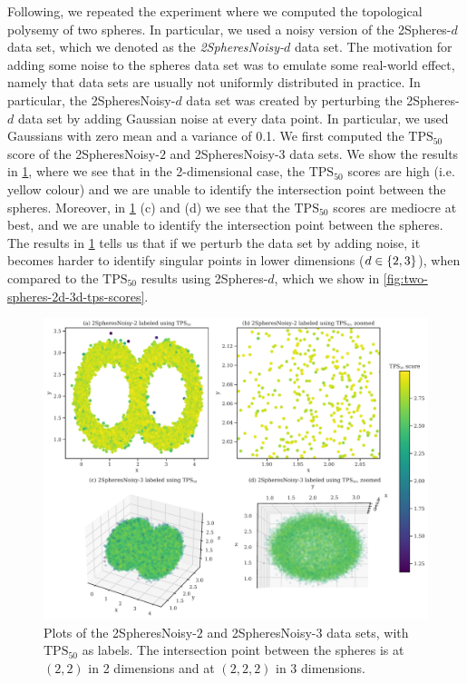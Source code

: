 Following, we repeated the experiment where we computed the topological polysemy of two spheres. In particular, we used a noisy version of the 2Spheres-$d$ data set, which we denoted as the \textit{2SpheresNoisy-$d$} data set. The motivation for adding some noise to the spheres data set was to emulate some real-world effect, namely that data sets are usually not uniformly distributed in practice. In particular, the 2SpheresNoisy-$d$ data set was created by perturbing the 2Spheres-$d$ data set by adding Gaussian noise at every data point. In particular, we used Gaussians with zero mean and a variance of 0.1. We first computed the $\text{TPS}_{50}$ score of the 2SpheresNoisy-$2$ and 2SpheresNoisy-$3$ data sets. We show the results in \cref{fig:two-spheres-noisy-2d-3d-tps-scores}, where we see that in the 2-dimensional case, the $\text{TPS}_{50}$ scores are high (i.e. yellow colour) and we are unable to identify the intersection point between the spheres. Moreover, in \cref{fig:two-spheres-noisy-2d-3d-tps-scores} (c) and (d) we see that the $\text{TPS}_{50}$ scores are mediocre at best, and we are unable to identify the intersection point between the spheres. The results in \cref{fig:two-spheres-noisy-2d-3d-tps-scores} tells us that if we perturb the data set by adding noise, it becomes harder to identify singular points in lower dimensions ($d \in \left\{2, 3\right\}$), when compared to the $\text{TPS}_{50}$ results using 2Spheres-$d$, which we show in \cref{fig:two-spheres-2d-3d-tps-scores}.
\begin{figure}[H]
    \centering
    \includegraphics[width=\textwidth]{thesis/figures/two-spheres-noisy-2d-3d-tps-scores.pdf}
    \caption{Plots of the 2SpheresNoisy-$2$ and 2SpheresNoisy-$3$ data sets, with $\text{TPS}_{50}$ as labels. The intersection point between the spheres is at $(2, 2)$ in 2 dimensions and at $(2, 2, 2)$ in 3 dimensions.}
    \label{fig:two-spheres-noisy-2d-3d-tps-scores}
\end{figure}

